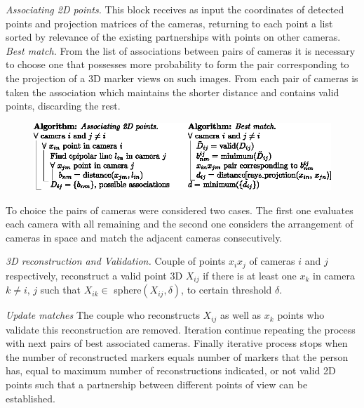 \textit{Associating 2D points.}\label{seccion_asociar2D_uno}
%
This block receives as input the coordinates of detected points and projection matrices of the cameras, returning to each point a list sorted by relevance of the existing partnerships with points on other cameras. \\ 
\textit{\hspace*{0.5cm}Best match.}\label{MejorAsociacion}
%
From the list of associations between pairs of cameras it is necessary to choose one that possesses more probability to form the pair corresponding to the projection of a 3D marker views on such images.
%
From each pair of cameras is taken the association which maintains the shorter distance and contains valid points, discarding the rest. 
\begin{figure}
    \begin{center}
       \includegraphics[scale=1.0]{./imagenes/Reconstruccion/Algoritmo_reconstruccion}       
    \end{center}
\end{figure}
%
To choice the pairs of cameras were considered two cases.
The first one evaluates each camera with all remaining and the second one considers the arrangement of cameras in space and match the adjacent cameras consecutively.

\textit{3D reconstruction and Validation.}\label{seccion_reconstruccion3D_validacion}
Couple of points $x_i x_j$ of cameras $i$ and $j$ respectively, reconstruct a valid point 3D $X_{ij}$ if there is at least one $x_k$ in camera $k\not= i, \,j$ such that $X_{ik} \in $ sphere$(X_{ij}, \delta)$, to certain threshold $\delta$.

\textit{Update matches}\label{actualizar_asociaciones}
The couple who reconstructs $X_{ij}$ as well as $x_k$ points who validate this reconstruction are removed. 
Iteration continue repeating the process with next pairs of best associated cameras.
Finally iterative process stops when the number of reconstructed markers equals number of markers that the person has, equal to maximum number of reconstructions indicated, or not valid 2D points such that a partnership between different points of view can be established.
